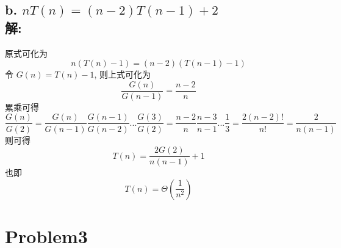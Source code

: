 \documentclass[12pt]{article}
\begin{document}
    \subsection*{b. $ nT(n)=(n-2)T(n-1)+2 $ \\\textbf{解:}}
      原式可化为
      \begin{equation}
        n(T(n)-1)=(n-2)(T(n-1)-1)
      \end{equation}
      令 $ G(n)=T(n)-1 $, 则上式可化为
      \begin{equation}
        \frac{G(n)}{G(n-1)}=\frac{n-2}{n}
      \end{equation}
      累乘可得
      \begin{equation}
        \frac{G(n)}{G(2)}=\frac{G(n)}{G(n-1)}\frac{G(n-1)}{G(n-2)}...\frac{G(3)}{G(2)}=\frac{n-2}{n}\frac{n-3}{n-1}...\frac{1}{3}=\frac{2(n-2)!}{n!}=\frac{2}{n(n-1)}
      \end{equation}
      则可得
      \begin{equation}
      	T(n)=\frac{2G(2)}{n(n-1)}+1
      \end{equation}
      也即
      \begin{equation}
        T(n)=\Theta\left(\frac{1}{n^2}\right)
      \end{equation}
  \section*{Problem3}
\end{document}
